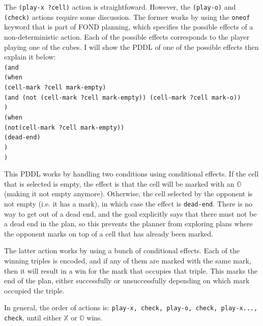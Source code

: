 \documentclass[11pt]{article}
\newcommand{\XX}{$\mathbb{X}$ }
\newcommand{\OO}{$\mathbb{O}$ }
\begin{document}
\noindent The \texttt{(play-x ?cell)} action is straightfoward. However, the \texttt{(play-o)} and \texttt{(check)} actions require some discussion. The former works by using the \texttt{oneof} keyword that is part of FOND planning, which specifies the possible effects of a non-deterministic action. Each of the possible effects corresponds to the player playing one of the cubes. I will show the PDDL of one of the possible effects then explain it below:\\
\texttt{(and \\
    \indent (when \\
    \indent \indent (cell-mark ?cell mark-empty) \\
    \indent \indent (and (not (cell-mark ?cell mark-empty)) (cell-mark ?cell mark-o))\\
    \indent )\\
    \indent (when \\
    \indent \indent (not(cell-mark ?cell mark-empty)) \\
    \indent \indent (dead-end) \\
    \indent)\\
)}

This PDDL works by handling two conditions using conditional effects. If the cell that is selected is empty, the effect is that the cell will be marked with an \OO (making it not empty anymore). Otherwise, the cell selected by the opponent is not empty (i.e. it has a mark), in which case the effect is \texttt{dead-end}. There is no way to get out of a dead end, and the goal explicitly says that there must not be a dead end in the plan, so this prevents the planner from exploring plans where the opponent marks on top of a cell that has already been marked.

The latter action works by using a bunch of conditional effects. Each of the winning triples is encoded, and if any of them are marked with the same mark, then it will result in a win for the mark that occupies that triple. This marks the end of the plan, either successfully or unsuccessfully depending on which mark occupied the triple.

In general, the order of actions is: \texttt{play-x, check, play-o, check, play-x..., check}, until either \XX or \OO wins.
\end{document}
